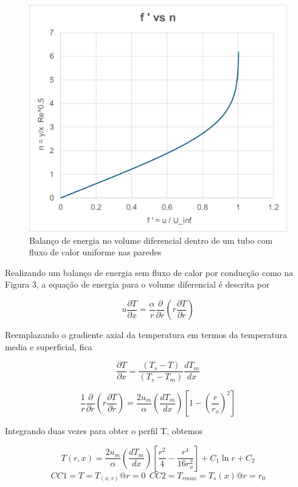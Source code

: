 \documentclass[12pt]{article}
\begin{document}
\begin{figure}[H]
	\centering
	\includegraphics[width=.65\textwidth]{Figures/1_3}
	\caption{Balanço de energia no volume diferencial dentro de um tubo com fluxo de calor uniforme nas paredes}
\end{figure}

Realizando um balanço de energia sem fluxo de calor por conducção como na Figura 3, a equação de energia para o volume diferencial é descrita por

\begin{equation}
	u \frac{\partial T}{\partial x} = \frac{\alpha}{r} \frac{\partial}{\partial r} \left( r \frac{\partial T}{\partial r} \right)
\end{equation}

Reemplazando o gradiente axial da temperatura em termos da temperatura media e superficial, fica

\begin{equation}
	 \frac{\partial T}{\partial x} = \frac{(T_s - T)}{(T_s - T_m)} \frac{d T_m}{d x} 
\end{equation}


\begin{equation}
	\frac{1}{r} \frac{\partial}{\partial r} \left( r \frac{\partial T}{\partial r} \right) = \frac{2 u_m}{\alpha} \left( \frac{d T_m}{d x} \right) \left[ 1 - \left( \frac{r}{r_o} \right)^2 \right]
\end{equation}

Integrando duas vezes para obter o perfil T, obtemos

\begin{equation}
	T(r, x) = \frac{2 u_m}{\alpha} \left( \frac{d T_m}{d x} \right) \left[ \frac{r^2}{4} - \frac{r^4}{16 r_o^2} \right] + C_1 \ln r + C_2 	
\end{equation}
\begin{equation}
	CC1 = T = T_{(x,r)} @ r=0	\ \ CC2 = T_{rmax} = T_{s}(x) @ r=r_{0}
\end{equation}
\end{document}
